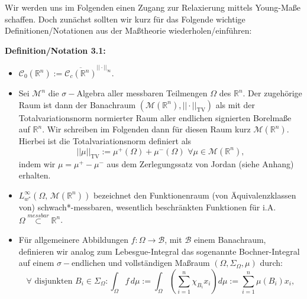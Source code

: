 Wir werden uns im Folgenden einen Zugang zur Relaxierung mittels Young-Maße schaffen. Doch zunächst sollten wir kurz für das Folgende wichtige Definitionen/Notationen aus der Maßtheorie wiederholen/einführen:\\
\colorbox{defblue}{\begin{minipage}{16cm}{\textcolor{black}{}{\label{def3.1}}}
\textbf{Definition/Notation 3.1:} 
\begin{itemize}
    \item \(\mathcal{C}_0(\mathbb{R}^n) := \overline{\mathcal{C}_c(\mathbb{R}^n)}^{||\cdot||_{\infty}}\).
    \item Sei \(\mathcal{M}^n\) die \(\sigma-\)Algebra aller messbaren Teilmengen \(\Omega\) des \(\mathbb{R}^n\). Der zugehörige Raum ist dann der Banachraum \((\mathcal{M}(\mathbb{R}^n),||\cdot||_{\text{TV}})\) als mit der Totalvariationsnorm normierter Raum aller endlichen signierten Borelmaße auf \(\mathbb{R}^n\). Wir schreiben im Folgenden dann für diesen Raum kurz \(\mathcal{M}(\mathbb{R}^n)\). Hierbei ist die Totalvariationsnorm definiert als
    \begin{equation}
        ||\mu||_{\text{TV}} := \mu^+(\Omega) + \mu^-(\Omega)\, \, \forall \mu \in \mathcal{M}(\mathbb{R}^n),
    \end{equation}
    indem wir \(\mu = \mu^+ - \mu^-\) aus dem Zerlegungssatz von Jordan (siehe Anhang) erhalten.
    \item \(L^{\infty}_{w^*}(\Omega,\,\mathcal{M}(\mathbb{R}^n))\) bezeichnet den Funktionenraum (von Äquivalenzklassen von) schwach*-messbaren, wesentlich beschränkten Funktionen für i.A. \(\Omega \stackrel{messbar}{\subset} \mathbb{R}^n\).
    \item Für allgemeinere Abbildungen \(f:\Omega \to \mathcal{B}\), mit \(\mathcal{B}\) einem Banachraum, definieren wir analog zum Lebesgue-Integral das sogenannte Bochner-Integral auf einem \(\sigma-\)endlichen und vollständigen Maßraum \((\Omega,\Sigma_{\Omega},\mu)\) durch:
    \begin{equation}
        \forall \text{ disjunkten } B_i \in \Sigma_{\Omega}: \int_{\Omega} f \, d\mu := \int_{\Omega} (\sum_{i=1}^n \chi_{B_i}x_i) d\mu := \sum_{i=1}^n \mu(B_i)x_i,
    \end{equation}
\end{itemize}
\end{minipage}}


